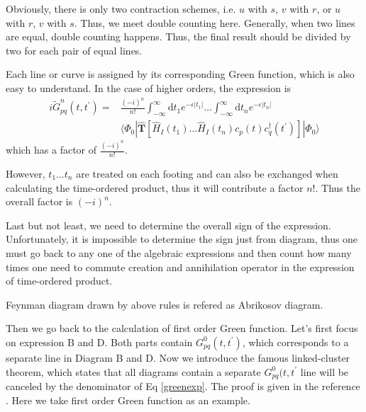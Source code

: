 Obviously, there is only two contraction schemes, i.e. $u$ with $s$, $v$ with $r$, or $u$ with $r$, $v$ with $s$. 
Thus, we meet double counting here.
Generally, when two lines are equal, double counting happens.
Thus, the final result should be divided by two for each pair of equal lines.


Each line or curve is assigned by its corresponding Green function, which is also easy to understand.
In the case of higher orders, the expression is 
\begin{equation} \label{greenexp}
\begin{aligned}
	i \tilde{G}^n_{p q}\left(t, t^{\prime}\right)
	=& \frac{(-i)^{n}}{n !} 
	\int_{-\infty}^{\infty} \mathrm{d} t_{1} e^{-\epsilon|t_{1}|} \ldots \int_{-\infty}^{\infty} \mathrm{d} t_{n} e^{-\epsilon|t_{n}|}
	\\
	& \langle\Phi_{0}|
	\hat{\boldsymbol{T}}\left[\hat{H}_{I}\left(t_{1}\right) \ldots \hat{H}_{I}\left(t_{n}\right) c_{p}(t) c_{q}^{\dagger}\left(t^{\prime}\right)\right]|
	\Phi_{0}\rangle
\end{aligned}
\end{equation}
which has a factor of $\frac{(-i)^n}{n!}$.

However, $t_1 \dots t_n$ are treated on each footing and can also be exchanged when calculating the time-ordered product, thus it will contribute a factor $n!$.
Thus the overall factor is $(-i)^n$.

Last but not least, we need to determine the overall sign of the expression.
Unfortunately, it is impossible to determine the sign just from diagram, thus one must go back to any one of the algebraic expressions and then count how many times one need to commute creation and annihilation operator in the expression of time-ordered product.

Feynman diagram drawn by above rules is refered as Abrikosov diagram.

Then we go back to the calculation of first order Green function.
Let's first focus on expression B and D.
Both parts contain $G^0_{pq}(t,t^{\prime})$, which corresponds to a separate line in Diagram B and D.
Now we introduce the famous linked-cluster theorem, which states that all diagrams contain a separate $G^0_{pq}(t,t^{\prime}$ line will be canceled by the denominator of Eq \ref{greenexp}.
The proof is given in the reference \cite{main}.
Here we take first order Green function as an example.

